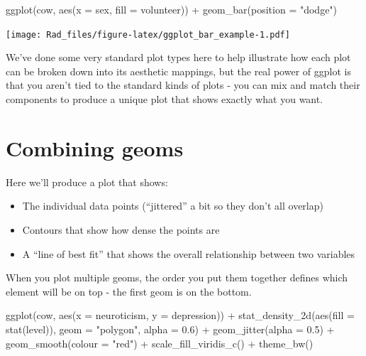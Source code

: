 \documentclass[
]{book}
\newenvironment{Shaded}{\begin{snugshade}}{\end{snugshade}}
\newcommand{\AttributeTok}[1]{\textcolor[rgb]{0.77,0.63,0.00}{#1}}
\newcommand{\FloatTok}[1]{\textcolor[rgb]{0.00,0.00,0.81}{#1}}
\newcommand{\FunctionTok}[1]{\textcolor[rgb]{0.00,0.00,0.00}{#1}}
\newcommand{\NormalTok}[1]{#1}
\newcommand{\SpecialCharTok}[1]{\textcolor[rgb]{0.00,0.00,0.00}{#1}}
\newcommand{\StringTok}[1]{\textcolor[rgb]{0.31,0.60,0.02}{#1}}
\providecommand{\tightlist}{%
  \setlength{\itemsep}{0pt}\setlength{\parskip}{0pt}}
\begin{document}
\begin{Shaded}
\begin{Highlighting}[]
\FunctionTok{ggplot}\NormalTok{(cow, }\FunctionTok{aes}\NormalTok{(}\AttributeTok{x =}\NormalTok{ sex, }\AttributeTok{fill =}\NormalTok{ volunteer)) }\SpecialCharTok{+}
    \FunctionTok{geom\_bar}\NormalTok{(}\AttributeTok{position =} \StringTok{"dodge"}\NormalTok{)}
\end{Highlighting}
\end{Shaded}

\texttt{[image: Rad\_files/figure-latex/ggplot\_bar\_example-1.pdf]}

We've done some very standard plot types here
to help illustrate how each plot can be broken down
into its aesthetic mappings, but the real power
of ggplot is that you aren't tied to the standard
kinds of plots - you can mix and match their
components to produce a unique plot that shows
exactly what you want.

\hypertarget{combining-geoms}{%
\section{Combining geoms}\label{combining-geoms}}

Here we'll produce a plot that shows:

\begin{itemize}
\tightlist
\item
  The individual data points (``jittered'' a bit so they
  don't all overlap)
\item
  Contours that show how dense the points are
\item
  A ``line of best fit'' that shows the overall relationship
  between two variables
\end{itemize}

When you plot multiple geoms, the order you put them
together defines which element will be on top - the
first geom is on the bottom.

\begin{Shaded}
\begin{Highlighting}[]
\FunctionTok{ggplot}\NormalTok{(cow, }\FunctionTok{aes}\NormalTok{(}\AttributeTok{x =}\NormalTok{ neuroticism, }\AttributeTok{y =}\NormalTok{ depression)) }\SpecialCharTok{+}
    \FunctionTok{stat\_density\_2d}\NormalTok{(}\FunctionTok{aes}\NormalTok{(}\AttributeTok{fill =} \FunctionTok{stat}\NormalTok{(level)),}
                    \AttributeTok{geom =} \StringTok{"polygon"}\NormalTok{,}
                    \AttributeTok{alpha =} \FloatTok{0.6}\NormalTok{) }\SpecialCharTok{+}
    \FunctionTok{geom\_jitter}\NormalTok{(}\AttributeTok{alpha =} \FloatTok{0.5}\NormalTok{) }\SpecialCharTok{+}
    \FunctionTok{geom\_smooth}\NormalTok{(}\AttributeTok{colour =} \StringTok{"red"}\NormalTok{) }\SpecialCharTok{+}
    \FunctionTok{scale\_fill\_viridis\_c}\NormalTok{() }\SpecialCharTok{+}
    \FunctionTok{theme\_bw}\NormalTok{()}
\end{Highlighting}
\end{Shaded}
\end{document}

